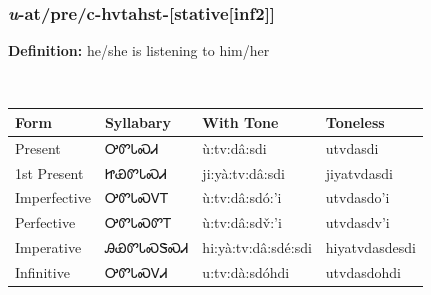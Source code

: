 \subsubsection*{\textit{u}{-}at/pre/c{-}\textbf{hvtahst}{-}[stative[inf2]]}
\nopagebreak
\textbf{Definition: } he/she is listening to him/her
\\[0.5em]
\begin{tabularx}{\textwidth}{l X X X}%
\toprule%
\textbf{Form}&\textbf{Syllabary}&\textbf{With Tone}&\textbf{Toneless}\\%
\midrule%
Present&ᎤᏛᏓᏍᏗ&ù:tv:dâ:sdi&utvdasdi\\%
1st Present&ᏥᏯᏛᏓᏍᏗ&ji:yà:tv:dâ:sdi&jiyatvdasdi\\%
Imperfective&ᎤᏛᏓᏍᏙᎢ&ù:tv:dâ:sdó:’i&utvdasdo’i\\%
Perfective&ᎤᏛᏓᏍᏛᎢ&ù:tv:dâ:sdv̌:’i&utvdasdv’i\\%
Imperative&ᎯᏯᏛᏓᏍᏕᏍᏗ&hi:yà:tv:dâ:sdé:sdi&hiyatvdasdesdi\\%
Infinitive&ᎤᏛᏓᏍᏙᏗ&u:tv:dà:sdóhdi&utvdasdohdi\\%
\bottomrule%
\end{tabularx}
\\[1em]